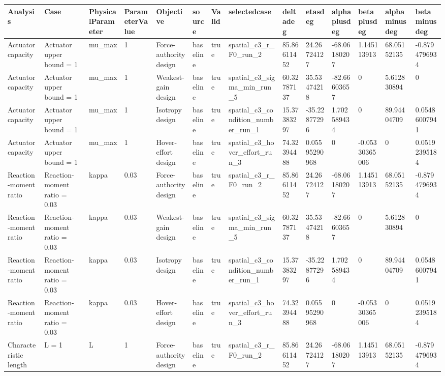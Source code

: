 \begin{tabular}{@{}llllllllllllll@{}}
\toprule
Analysis & Case & PhysicalParameter & ParameterValue & Objective & source & Valid & selectedcase & deltadeg & etasdeg & alphaplusdeg & betaplusdeg & alphaminusdeg & betaminusdeg \\
\midrule
Actuator capacity & Actuator upper bound = 1 & mu\_max & 1 & Force-authority design & baseline & true & spatial\_c3\_r\_F0\_run\_2 & 85.86611452 & 24.26724127 & -68.06180207 & 1.145113913 & 68.05152135 & -0.8794796934 \\
Actuator capacity & Actuator upper bound = 1 & mu\_max & 1 & Weakest-gain design & baseline & true & spatial\_c3\_sigma\_min\_run\_5 & 60.32787137 & 35.53474218 & -82.66603657 & 0 & 5.612830894 & 0 \\
Actuator capacity & Actuator upper bound = 1 & mu\_max & 1 & Isotropy design & baseline & true & spatial\_c3\_condition\_number\_run\_1 & 15.37383297 & -35.22877296 & 1.702589434 & 0 & 89.94404709 & 0.05486007941 \\
Actuator capacity & Actuator upper bound = 1 & mu\_max & 1 & Hover-effort design & baseline & true & spatial\_c3\_hover\_effort\_run\_3 & 74.32394488 & 0.05595290968 & 0 & -0.05330365006 & 0 & 0.05192395184 \\
Reaction-moment ratio & Reaction-moment ratio = 0.03 & kappa & 0.03 & Force-authority design & baseline & true & spatial\_c3\_r\_F0\_run\_2 & 85.86611452 & 24.26724127 & -68.06180207 & 1.145113913 & 68.05152135 & -0.8794796934 \\
Reaction-moment ratio & Reaction-moment ratio = 0.03 & kappa & 0.03 & Weakest-gain design & baseline & true & spatial\_c3\_sigma\_min\_run\_5 & 60.32787137 & 35.53474218 & -82.66603657 & 0 & 5.612830894 & 0 \\
Reaction-moment ratio & Reaction-moment ratio = 0.03 & kappa & 0.03 & Isotropy design & baseline & true & spatial\_c3\_condition\_number\_run\_1 & 15.37383297 & -35.22877296 & 1.702589434 & 0 & 89.94404709 & 0.05486007941 \\
Reaction-moment ratio & Reaction-moment ratio = 0.03 & kappa & 0.03 & Hover-effort design & baseline & true & spatial\_c3\_hover\_effort\_run\_3 & 74.32394488 & 0.05595290968 & 0 & -0.05330365006 & 0 & 0.05192395184 \\
Characteristic length & L = 1 & L & 1 & Force-authority design & baseline & true & spatial\_c3\_r\_F0\_run\_2 & 85.86611452 & 24.26724127 & -68.06180207 & 1.145113913 & 68.05152135 & -0.8794796934 \\

\end{tabular}
